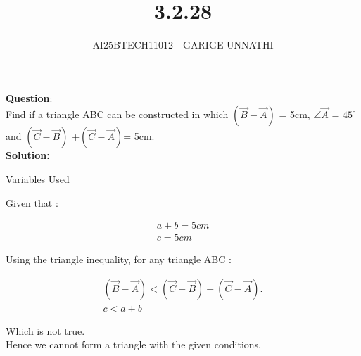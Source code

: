 \documentclass[journal]{IEEEtran}
\begin{document}

\vspace{3cm}

\title{3.2.28}
\author{AI25BTECH11012 - GARIGE UNNATHI}
{\let\newpage\relax\maketitle}


\renewcommand{\thefigure}{\theenumi}
\renewcommand{\thetable}{\theenumi}
\setlength{\intextsep}{10pt} %


\renewcommand{\thetable}{\theenumi}


\textbf{Question}:\\
Find if a triangle ABC can be constructed in which $(\vec{B} - \vec{A})$ = 5cm, $\angle \vec{A}$ = $45^\circ$ and $(\vec{C} - \vec{B})$ +$(\vec{C} - \vec{A})$= 5cm.\\
\textbf{Solution: }

 \begin{table}[h!]    
      \centering
      
      \caption{Variables Used}
      \label{}
    \end{table}

Given that : 

\begin{align*}
  a + b = 5 cm\\
  c = 5cm
\end{align*}

Using the triangle inequality, for any triangle ABC :



\begin{align}
    (\vec{B} - \vec{A})<(\vec{C} - \vec{B})+(\vec{C} - \vec{A}).\\
    c < a+b
 \end{align}


Which is not true.\\

Hence we cannot form a triangle with the given conditions.
\end{document}
